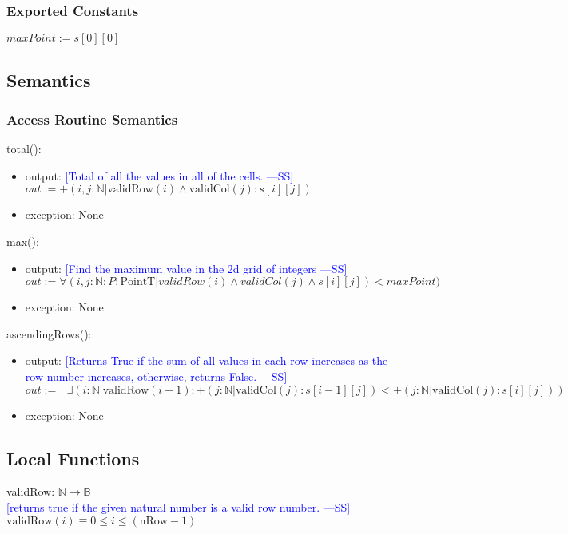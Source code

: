 \documentclass[12pt]{article}
\newcommand{\authornote}[3]{\textcolor{#1}{[#3 ---#2]}}
\newcommand{\authornote}[3]{}
\newcommand{\wss}[1]{\authornote{blue}{SS}{#1}}
\begin{document}
\subsubsection* {Exported Constants}
$maxPoint := s[0][0]$

\subsection* {Semantics}

\subsubsection* {Access Routine Semantics}

\noindent total():
\begin{itemize}
\item output: \wss{Total of all the values in all of the cells.}\\
$out := +(i,j : \mathbb{N}| \mbox{validRow}(i) \land  \mbox{validCol}(j) : s[i][j])$
\item exception: None
\end{itemize}

\noindent max():
\begin{itemize}
\item output: \wss{Find the maximum value in the 2d grid of integers}\\
$out := \forall(i, j : \mathbb{N} : P : \mbox{PointT} | validRow(i) \land validCol(j) \land  s[i][j]) < maxPoint)$
\item exception: None
\end{itemize}

\noindent ascendingRows():
\begin{itemize}
\item output: \wss{Returns True if the sum of all values in each row increases
    as the row number increases, otherwise, returns False.}\\
$out := \lnot \exists(i:\mathbb{N} | \mbox{validRow}(i-1) : +(j:\mathbb{N} | \mbox{validCol}(j) : s[i-1][j]) < +(j:\mathbb{N} | \mbox{validCol}(j) : s[i][j]) ) $
\item exception: None
\end{itemize}

\subsection*{Local Functions}

\noindent validRow: $\mathbb{N} \rightarrow \mathbb{B}$\\
\noindent \wss{returns true if the given natural number is a valid row number.}\\ 
$\mbox{validRow}(i) \equiv 0 \le i \le (\mbox{nRow} - 1)$ \\
\end{document}
